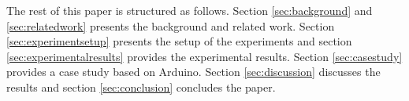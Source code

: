 The rest of this paper is structured as follows.  Section \ref{sec:background} and \ref{sec:relatedwork} presents the background and related work. Section \ref{sec:experimentsetup} presents the setup of the experiments and section \ref{sec:experimentalresults} provides the experimental results. Section \ref{sec:casestudy} provides a case study based on Arduino.  Section \ref{sec:discussion} discusses the results and section \ref{sec:conclusion} concludes the paper.    
